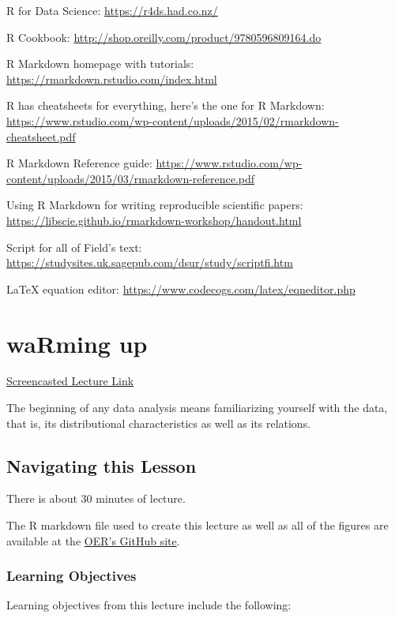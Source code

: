 \documentclass[
  english,
]{book}
\begin{document}
R for Data Science: \url{https://r4ds.had.co.nz/}

R Cookbook: \url{http://shop.oreilly.com/product/9780596809164.do}

R Markdown homepage with tutorials: \url{https://rmarkdown.rstudio.com/index.html}

R has cheatsheets for everything, here's the one for R Markdown: \url{https://www.rstudio.com/wp-content/uploads/2015/02/rmarkdown-cheatsheet.pdf}

R Markdown Reference guide: \url{https://www.rstudio.com/wp-content/uploads/2015/03/rmarkdown-reference.pdf}

Using R Markdown for writing reproducible scientific papers: \url{https://libscie.github.io/rmarkdown-workshop/handout.html}

Script for all of Field's text: \url{https://studysites.uk.sagepub.com/dsur/study/scriptfi.htm}

LaTeX equation editor: \url{https://www.codecogs.com/latex/eqneditor.php}

\hypertarget{waRmups}{%
\chapter{waRming up}\label{waRmups}}

\href{https://spu.hosted.panopto.com/Panopto/Pages/Viewer.aspx?pid=fd132ba0-4bdc-47d4-94cd-ac40004a134b}{Screencasted Lecture Link}

The beginning of any data analysis means familiarizing yourself with the data, that is, its distributional characteristics as well as its relations.

\hypertarget{navigating-this-lesson-1}{%
\section{Navigating this Lesson}\label{navigating-this-lesson-1}}

There is about 30 minutes of lecture.

The R markdown file used to create this lecture as well as all of the figures are available at the \href{https://github.com/lhbikos/ReC_Topics}{OER's GitHub site}.

\hypertarget{learning-objectives-1}{%
\subsection{Learning Objectives}\label{learning-objectives-1}}

Learning objectives from this lecture include the following:
\end{document}
